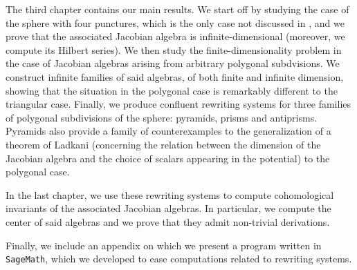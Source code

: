 \begin{chapter}
The third chapter contains our main results. We start off by studying the case of the sphere with four punctures, which is the only case not discussed in \cite{Lad12}, and we prove that the associated Jacobian algebra is infinite-dimensional (moreover, we compute its Hilbert series). We then study the finite-dimensionality problem in the case of Jacobian algebras arising from arbitrary polygonal subdvisions. We construct infinite families of said algebras, of both finite and infinite dimension, showing that the situation in the polygonal case is remarkably different to the triangular case. Finally, we produce confluent rewriting systems for three families of polygonal subdivisions of the sphere: pyramids, prisms and antiprisms. Pyramids also provide a family of counterexamples to the generalization of a theorem of Ladkani (concerning the relation between the dimension of the Jacobian algebra and the choice of scalars appearing in the potential) to the polygonal case.

In the last chapter, we use these rewriting systems to compute cohomological invariants of the associated Jacobian algebras. In particular, we compute the center of said algebras and we prove that they admit non-trivial derivations.

Finally, we include an appendix on which we present a program written in \texttt{SageMath}, which we developed to ease computations related to rewriting systems.
\end{chapter}